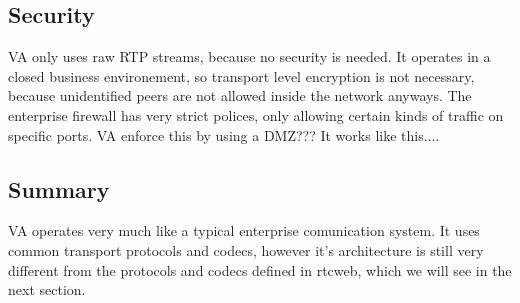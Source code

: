 \subsection{Security}
VA only uses raw RTP streams, because no security is needed. It operates in a closed business environement, so transport level encryption is not necessary, because unidentified peers are not allowed inside the network anyways. The enterprise firewall has very strict polices, only allowing certain kinds of traffic on specific ports. VA enforce this by using a DMZ??? It works like this....

\subsection*{Summary}
VA operates very much like a typical enterprise comunication system. It uses common transport protocols and codecs, however it's architecture is still very different from the protocols and codecs defined in \gls{rtcweb}, which we will see in the next section.